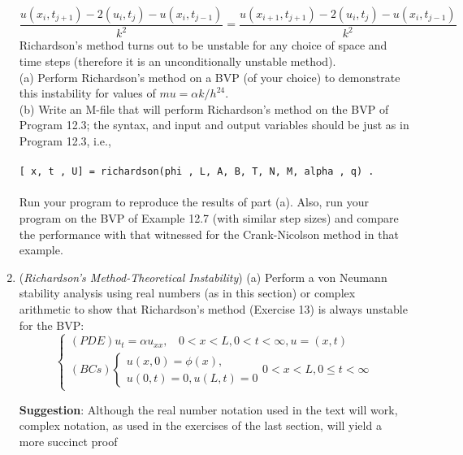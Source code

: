 \documentclass[../main.tex]{subfiles}
\begin{document}
\begin{enumerate}
$$
\dfrac{u(x_i,t_{j+1})-2(u_i,t_j)-u(x_i,t_{j-1})}{k^2}=
\dfrac{u(x_{i+1},t_{j+1})-2(u_i,t_j)-u(x_i,t_{j-1})}{k^2}
$$
Richardson's method turns out to be unstable for any choice of space and time steps (therefore it is an unconditionally unstable method).
\\
(a) Perform Richardson's method on a BVP (of your choice) to demonstrate this instability for  values of $mu =\alpha k/h^24$.
\\
(b) Write an M-file that will perform Richardson's method on the BVP of Program 12.3; the syntax, and input and output variables should be just as in Program 12.3, i.e., 
\\
\\
\texttt{[ x, t , U] = richardson(phi , L, A, B, T, N, M, alpha , q) .}
\\
\\
Run your program to reproduce the results of part (a). Also, run your program on the BVP of Example 12.7 (with similar step sizes) and compare the performance with that witnessed for the Crank-Nicolson method in that example.
		\item
			(\textit{Richardson's Method-Theoretical Instability}) (a) Perform a von Neumann stability analysis 
using real numbers (as in this section) or complex arithmetic to show that Richardson's method 
(Exercise 13) is always unstable for the BVP: 
$$\begin{cases} 
	(PDE) u_t=\alpha u_{xx},
	~~~~0<x<L, 0<t<\infty,u=(x,t)\\
(BCs)
		\begin{cases}
		u(x,0)=\phi(x),\\
		u(0,t)=0, u(L,t)=0
		\end{cases}
		0 < x < L, 0 \leqslant t < \infty 
	\end{cases}$$
	
\textbf{Suggestion}: Although the real number notation used in the text will work, complex notation, as 
used in the exercises of the last section, will yield a more succinct proof	


\end{enumerate}
\end{document}
